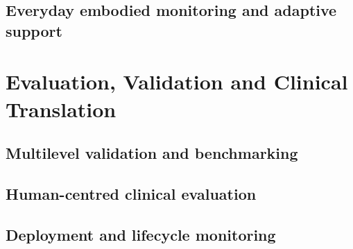 \documentclass[12pt,a4paper]{article}
\begin{document}




\subsection{Everyday embodied monitoring and adaptive support}
\label{subsec:everyday_monitoring}





\section{Evaluation, Validation and Clinical Translation}
\label{sec:validation_clinical_translation}

\subsection{Multilevel validation and benchmarking}
\label{subsec:multilevel_validation_benchmarking}

\subsection{Human-centred clinical evaluation}
\label{subsec:human_centred_clinical_evaluation}

\subsection{Deployment and lifecycle monitoring}
\label{subsec:deployment_lifecycle_monitoring}
\end{document}
